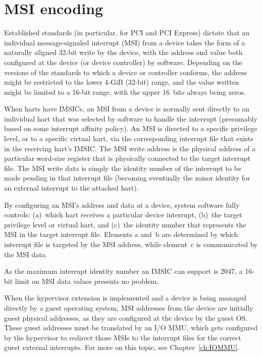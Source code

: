 \section{MSI encoding}
\label{sec:MSIEncoding}

Established standards (in particular, for PCI and PCI Express) dictate
that an individual message-signaled interrupt (MSI) from a device takes
the form of a naturally aligned \mbox{32-bit} write by the device,
with the address and value both configured at the device (or device
controller) by software.
Depending on the versions of the standards to which a device or
controller conforms, the address might be restricted to the lower
\mbox{4-GiB} (\mbox{32-bit}) range, and the value written might be
limited to a \mbox{16-bit} range, with the upper 16~bits always being
zeros.

When {\RISCV} harts have IMSICs, an MSI from a device is normally sent
directly to an individual hart that was selected by software to handle
the interrupt (presumably based on some interrupt affinity policy).
An MSI is directed to a specific privilege level, or to a specific
virtual hart, via the corresponding interrupt file that exists in the
receiving hart's IMSIC.
The MSI write address is the physical address of a particular word-size
register that is physically connected to the target interrupt file.
The MSI write data is simply the identity number of the interrupt to
be made pending in that interrupt file (becoming eventually the minor
identity for an external interrupt to the attached hart).

By configuring an MSI's address and data at a device, system software
fully controls:
(a)~which hart receives a particular device interrupt,
(b)~the target privilege level or virtual hart, and
(c)~the identity number that represents the MSI in the target interrupt
file.
Elements a and~b are determined by which interrupt file is targeted by
the MSI address, while element~c is communicated by the MSI data.

\begin{commentary}
As the maximum interrupt identity number an IMSIC can support is 2047,
a \mbox{16-bit} limit on MSI data values presents no problem.
\end{commentary}

When the hypervisor extension is implemented and a device is being
managed directly by a guest operating system, MSI addresses from the
device are initially guest physical addresses, as they are configured
at the device by the guest OS.
These guest addresses must be translated by an I/O MMU, which gets
configured by the hypervisor to redirect those MSIs to the interrupt
files for the correct guest external interrupts.
For more on this topic, see Chapter~\ref{ch:IOMMU}.

